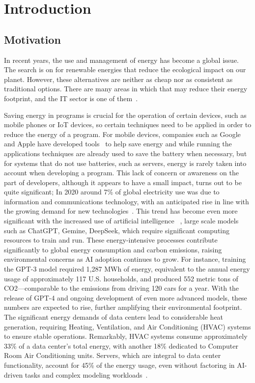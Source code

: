 


\chapter{Introduction}

\section{Motivation}

In recent years, the use and management of energy has become a global issue. The search is on for renewable energies that reduce the ecological impact on our planet. However, these alternatives are neither as cheap nor as consistent as traditional options. There are many areas in which that may reduce their energy footprint, and the IT sector is one of them~\cite{annurev:/content/journals/10.1146/annurev.resource.102308.124234,10.1145/1666420.1666438}.

Saving energy in programs is crucial for the operation of certain devices, such as mobile phones or IoT devices, so certain techniques need to be applied in order to reduce the energy of a program. For mobile devices, companies such as Google and Apple have developed tools~\cite{google_adaptive_battery,google_battery_saver,apple_clean_energy, android_power_profiler} to help save energy and while running the applications techniques are already used to save the battery when necessary, but for systems that do not use batteries, such as servers, energy is rarely taken into account when developing a program. This lack of concern or awareness on the part of developers, although it appears to have a small impact, turns out to be quite significant; In 2020 around 7\% of global electricity use was due to information and communications technology, with an anticipated rise in line with the growing demand for new technologies~\cite{article}. This trend has become even more significant with the increased use of artificial intelligence ~\cite{patterson2021carbon}, large scale models such as ChatGPT, Gemine, DeepSeek, which require significant computing resources to train and run. These energy-intensive processes contribute significantly to global energy consumption and carbon emissions, raising environmental concerns as AI adoption continues to grow. For instance, training the GPT-3 model required 1,287 MWh of energy, equivalent to the annual energy usage of approximately 117 U.S. households, and produced 552 metric tons of CO2—comparable to the emissions from driving 120 cars for a year. With the release of GPT-4 and ongoing development of even more advanced models, these numbers are expected to rise, further amplifying their environmental footprint. The significant energy demands of data centers lead to considerable heat generation, requiring Heating, Ventilation, and Air Conditioning (HVAC) systems to ensure stable operations. Remarkably, HVAC systems consume approximately 33\% of a data center's total energy, with another 18\% dedicated to Computer Room Air Conditioning units. Servers, which are integral to data center functionality, account for 45\% of the energy usage, even without factoring in AI-driven tasks and complex modeling workloads~\cite{balaras2017high}.


